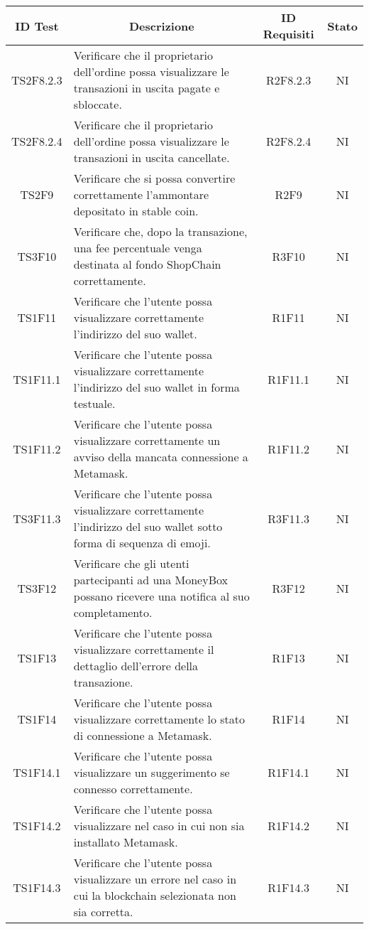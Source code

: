 \begin{table}[H]
  \centering
  \renewcommand{\arraystretch}{1.8}
  \begin{tabular}{c|p{8cm}|c|c}
    \rowcolor[HTML]{125E28}
    \color[HTML]{FFFFFF}\textbf{ID Test}
           & \multicolumn{1}{c}{\color[HTML]{FFFFFF}\textbf{Descrizione}}
           & \color[HTML]{FFFFFF}\textbf{ID Requisiti}
           & \color[HTML]{FFFFFF}\textbf{Stato}                                                                                      \\
    \hline
    TS2F8.2.3 & Verificare che il proprietario dell'ordine possa visualizzare le transazioni in uscita pagate e sbloccate.                & R2F8.2.3 & NI \\
    TS2F8.2.4 & Verificare che il proprietario dell'ordine possa visualizzare le transazioni in uscita cancellate.                        & R2F8.2.4 & NI \\
    TS2F9  & Verificare che si possa convertire correttamente l'ammontare depositato in stable coin\glo{}.                    & R2F9  & NI \\
    TS3F10 & Verificare che, dopo la transazione, una fee percentuale venga destinata al fondo ShopChain correttamente.       & R3F10 & NI \\
    TS1F11 & Verificare che l'utente possa visualizzare correttamente l'indirizzo del suo wallet\glo{}.                             & R1F11 & NI \\
    TS1F11.1 & Verificare che l'utente possa visualizzare correttamente l'indirizzo del suo wallet\glo{} in forma testuale.         & R1F11.1 & NI \\
    TS1F11.2 & Verificare che l'utente possa visualizzare correttamente un avviso della mancata connessione a Metamask\glo{}.         & R1F11.2 & NI \\
    TS3F11.3 & Verificare che l'utente possa visualizzare correttamente l'indirizzo del suo wallet\glo{} sotto forma di sequenza di emoji.  & R3F11.3 & NI \\
    TS3F12 & Verificare che gli utenti partecipanti ad una MoneyBox\glo{} possano ricevere una notifica al suo completamento.  & R3F12 & NI \\
    TS1F13 & Verificare che l'utente possa visualizzare correttamente il dettaglio dell'errore della transazione.  & R1F13 & NI \\
    TS1F14 & Verificare che l'utente possa visualizzare correttamente lo stato di connessione a Metamask\glo{}.  & R1F14 & NI \\
    TS1F14.1 & Verificare che l'utente possa visualizzare un suggerimento se connesso correttamente.  & R1F14.1 & NI \\
    TS1F14.2 & Verificare che l'utente possa visualizzare nel caso in cui non sia installato Metamask\glo{}.  & R1F14.2 & NI \\
    TS1F14.3 & Verificare che l'utente possa visualizzare un errore nel caso in cui la blockchain\glo{} selezionata non sia corretta. & R1F14.3 & NI \\
  \end{tabular}
\end{table}
